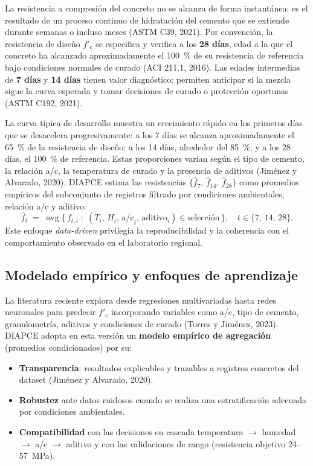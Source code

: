 La resistencia a compresión del concreto no se alcanza de forma instantánea: es el resultado de un proceso continuo de hidratación del cemento que se extiende durante semanas o incluso meses (ASTM C39, 2021). Por convención, la resistencia de diseño $f'_c$ se especifica y verifica a los \textbf{28 días}, edad a la que el concreto ha alcanzado aproximadamente el 100~\% de su resistencia de referencia bajo condiciones normales de curado (ACI 211.1, 2016). Las edades intermedias de \textbf{7 días} y \textbf{14 días} tienen valor diagnóstico: permiten anticipar si la mezcla sigue la curva esperada y tomar decisiones de curado o protección oportunas (ASTM C192, 2021).

La curva típica de desarrollo muestra un crecimiento rápido en los primeros días que se desacelera progresivamente: a los 7 días se alcanza aproximadamente el 65~\% de la resistencia de diseño; a los 14 días, alrededor del 85~\%; y a los 28 días, el 100~\% de referencia. Estas proporciones varían según el tipo de cemento, la relación a/c, la temperatura de curado y la presencia de aditivos (Jiménez y Alvarado, 2020). DIAPCE estima las resistencias $\{\hat{f}_7,\, \hat{f}_{14},\, \hat{f}_{28}\}$ como promedios empíricos del subconjunto de registros filtrado por condiciones ambientales, relación a/c y aditivo:
\[
\hat{f}_{t} \;=\; \operatorname{avg}\bigl\{\, f_{t,i} \;:\; (T_i,\, H_i,\, \mathrm{a/c}_i,\, \mathrm{aditivo}_i) \in \text{selección}\,\bigr\},
\quad t \in \{7,\, 14,\, 28\}.
\]
Este enfoque \textit{data-driven} privilegia la reproducibilidad y la coherencia con el comportamiento observado en el laboratorio regional.

\subsection{Modelado empírico y enfoques de aprendizaje}

La literatura reciente explora desde regresiones multivariadas hasta redes neuronales para predecir $f'_c$ incorporando variables como a/c, tipo de cemento, granulometría, aditivos y condiciones de curado (Torres y Jiménez, 2023). DIAPCE adopta en esta versión un \textbf{modelo empírico de agregación} (promedios condicionados) por su:

\begin{itemize}
  \item \textbf{Transparencia}: resultados explicables y trazables a registros concretos del dataset (Jiménez y Alvarado, 2020).
  \item \textbf{Robustez} ante datos ruidosos cuando se realiza una estratificación adecuada por condiciones ambientales.
  \item \textbf{Compatibilidad} con las decisiones en cascada temperatura $\rightarrow$ humedad $\rightarrow$ a/c $\rightarrow$ aditivo y con las validaciones de rango (resistencia objetivo 24–57~MPa).
\end{itemize}

